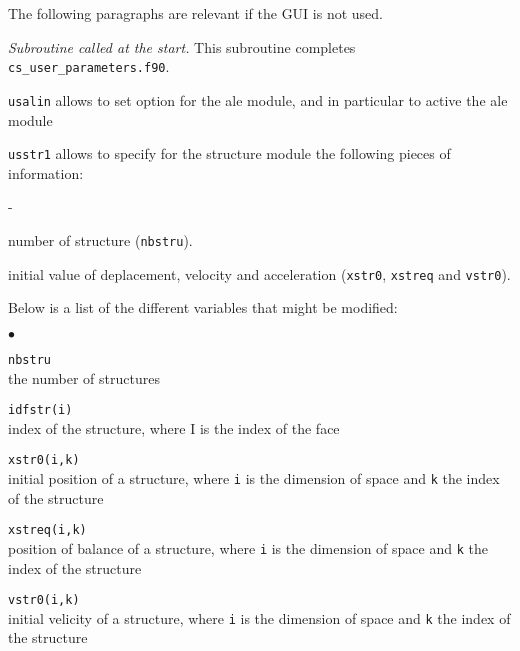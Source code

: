 {{{The following paragraphs are relevant if the GUI is not used.

\noindent
\textit{Subroutine called at the start.}
This subroutine completes \texttt{cs\_user\_parameters.f90}.

\texttt{usalin} allows to set option for the ale module, and in
particular to active the ale module


\texttt{usstr1} allows to specify for the structure module the
following pieces of information:
\begin{list}{-}{}
  \item number of structure (\texttt{nbstru}).
  \item initial value of deplacement, velocity and acceleration
    (\texttt{xstr0}, \texttt{xstreq} and \texttt{vstr0}).
\end{list}

Below is a list of the different variables that might be modified:

\begin{list}{$\bullet$}{}

\item{\texttt{nbstru}} \\
{the number of structures}

\item{\texttt{idfstr(i)}} \\
{index of the structure, where I is the index of the face}

\item{\texttt{xstr0(i,k)}} \\
{initial position of a structure, where \texttt{i} is the dimension of space
and \texttt{k} the index of the structure}

\item{\texttt{xstreq(i,k)}} \\
{position of balance of a structure, where \texttt{i} is the dimension of space
and \texttt{k} the index of the structure}

\item{\texttt{vstr0(i,k)}} \\
{initial velicity of a structure, where \texttt{i} is the dimension of space
and \texttt{k} the index of the structure }
\end{list}

}}}
